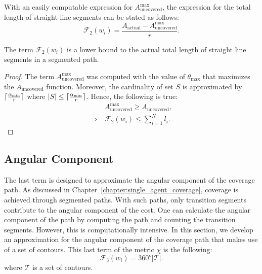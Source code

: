 \documentclass[../main.tex]{subfiles}
\begin{document}
With an easily computable expression for $A_{\text{uncovered}}^{\max}$, the expression for the total length of straight line segments can be stated as follows:
\begin{equation}
	\mathcal{F}_2(w_i)=\frac{A_{\text{actual}}-A_{\text{uncovered}}^{\max}}{r}.
\end{equation}

\begin{proposition}
The term $\mathcal{F}_2(w_i)$ is a lower bound to the actual total length of straight line segments in a segmented path.
\end{proposition}
\begin{proof}
The term $A_{\text{uncovered}}^{\max}$ was computed with the value of $\theta_{\max}$ that maximizes the $A_{\text{uncovered}}$ function. Moreover, the cardinality of set $S$ is approximated by $\lceil\frac{\alpha_{\min}}{r}\rceil$ where $|S|\leq\lceil\frac{\alpha_{\min}}{r}\rceil$. Hence, the following is true:
\begin{equation}
\begin{aligned}
	&A_{\text{uncovered}}^{\max}\geq A_{\text{uncovered}},\\
	\Longrightarrow\  &\mathcal{F}_2(w_i)\leq\sum_{i=1}^Nl_i.
	\end{aligned}
\end{equation}
\end{proof}



\subsection{Angular Component}
\label{subsection:angular_component}

The last term is designed to approximate the angular component of the coverage path. As discussed in Chapter~\ref{chapter:single_agent_coverage}, coverage is achieved through segmented paths. With such paths, only transition segments contribute to the angular component of the cost. One can calculate the angular component of the path by computing the path and counting the transition segments. However, this  is computationally intensive. In this section, we develop an approximation for the angular component of the coverage path that makes use of a set of contours. This last term of the metric $\chi$ is the following:
\begin{equation}
	\label{eq:f3}
	\mathcal{F}_3(w_i)=360^o|\mathcal{T}|.
\end{equation}%
where $\mathcal{T}$ is a set of contours.
\end{document}

